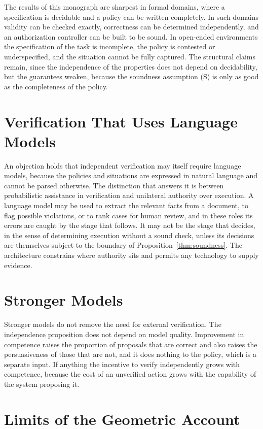 The results of this monograph are sharpest in formal domains, where a specification is decidable and a policy can be written completely. In such domains validity can be checked exactly, correctness can be determined independently, and an authorization controller can be built to be sound. In open-ended environments the specification of the task is incomplete, the policy is contested or underspecified, and the situation cannot be fully captured. The structural claims remain, since the independence of the properties does not depend on decidability, but the guarantees weaken, because the soundness assumption (S) is only as good as the completeness of the policy.

\section{Verification That Uses Language Models}

An objection holds that independent verification may itself require language models, because the policies and situations are expressed in natural language and cannot be parsed otherwise. The distinction that answers it is between probabilistic assistance in verification and unilateral authority over execution. A language model may be used to extract the relevant facts from a document, to flag possible violations, or to rank cases for human review, and in these roles its errors are caught by the stage that follows. It may not be the stage that decides, in the sense of determining execution without a sound check, unless its decisions are themselves subject to the boundary of Proposition~\ref{thm:soundness}. The architecture constrains where authority sits and permits any technology to supply evidence.

\section{Stronger Models}

Stronger models do not remove the need for external verification. The independence proposition does not depend on model quality. Improvement in competence raises the proportion of proposals that are correct and also raises the persuasiveness of those that are not, and it does nothing to the policy, which is a separate input. If anything the incentive to verify independently grows with competence, because the cost of an unverified action grows with the capability of the system proposing it.

\section{Limits of the Geometric Account}

